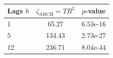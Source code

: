 \begin{tabular}{lcc}\toprule
Lags $h$ & $\zeta_{\mathrm{ARCH}}=T R^2$ & $p$-value \\\midrule
1 & 65.27 & 6.53e-16 \\
5 & 134.43 & 2.73e-27 \\
12 & 236.71 & 8.04e-44 \\
\bottomrule\end{tabular}
